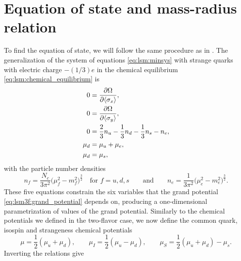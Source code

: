 


\section{Equation of state and mass-radius relation}

To find the equation of state,
we will follow the same procedure as in .
The generalization of the system of equations \eqref{eq:lsm:minsys} with strange quarks with electric charge $-(1/3)e$ in the chemical equilibrium \eqref{eq:lsm:chemical_equilibrium} is
\begin{subequations}
\begin{align}
	0 &= \pdv{\Omega}{ \langle \sigma_x \rangle}, \\
	0 &= \pdv{\Omega}{ \langle \sigma_y \rangle}, \\
	0 &= \frac23 n_u - \frac13 n_d - \frac13 n_s - n_e, \\
	\mu_d &= \mu_u + \mu_e, \\
	\mu_d &= \mu_s,
\end{align}%
\label{eq:lsm3f:minsys}%
\end{subequations}%
with the particle number densities
\begin{equation}
	n_f = \frac{N_c}{3\pi^2} \Big(\mu_f^2 - m_f^2\Big)^{\frac32} \quad \text{for $f = u,d,s$}
	\qquad \text{and} \qquad
	n_e = \frac{  1}{3\pi^2} \Big(\mu_e^2 - m_e^2\Big)^{\frac32}.
\label{eq:lsm3f:particle_densities}
\end{equation}
These five equations constrain the six variables that the grand potential \eqref{eq:lsm3f:grand_potential} depends on,
producing a one-dimensional parametrization of values of the grand potential.
Similarly to the chemical potentials  we defined in the two-flavor case,
we now define the common quark, isospin and strangeness chemical potentials
\begin{equation}
	\mu = \frac12 (\mu_u + \mu_d), \qquad
	\mu_I = \frac12 (\mu_u - \mu_d), \qquad
	\mu_S = \frac12 (\mu_u + \mu_d) - \mu_s.
\end{equation}
Inverting the relations give
